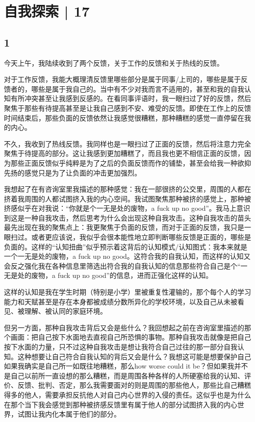 \chapter{自我探索 | 17}



\section*{1}

今天上午，我陆续收到了两个反馈，关于工作的反馈和关于热线的反馈。

对于工作反馈，我能大概理清反馈里哪些部分是属于同事/上司的，哪些是属于反馈者的，哪些是属于我自己的。当中有不少对我而言不适用的，甚至和我的自我认知有所冲突甚至让我感到反感的。在看同事评语时，我一眼扫过了好的反馈，然后聚焦于那些有待提高甚至是让我自己感到不安、难受的反馈。即使在工作上的反馈时间结束后，那些负面的反馈依然让我感觉很糟糕，那种糟糕的感觉一直停留在我的内心。

不久，我收到了热线反馈。我同样也是一眼扫过了正面的反馈，然后将注意力完全聚焦于待提高的部分。这让我感到更加糟糕了，而且我也更不相信正面的反馈，因为那些正面反馈似乎纯粹是为了之后的负面反馈而作的铺垫，甚至会给我一种欲抑先扬的感觉\pozhehao{}只是为了让负面的冲击更加强烈。

我想起了在有咨询室里我描述的那种感觉：我在一部很挤的公交里，周围的人都在挤着我\pozhehao{}周围的人都试图挤入我的内心空间。我试图聚焦那种被挤的感觉上，那种被挤感似乎在对我说：“你就是个一无是处的废物，a fuck up no good”。我马上意识到这是一种自我攻击，然后思考为什么会出现这种自我攻击。这种自我攻击的苗头最先出现在我的聚焦点上：我更聚焦于负面的反馈，而对于正面的反馈，我只是一眼扫过。或者更应该说，我似乎会很本能性地立即判断哪些反馈是正面的，哪些是负面的。这样的“认知扭曲”似乎预示着这背后的认知模式/认知图式：我本来就是一个一无是处的废物，a fuck up no good。这符合我的自我认知，而这样的认知又会反之强化我在各种信息里筛选出符合我的自我认知的信息\pozhehao{}那些符合自己是个“一无是处的废物，a fuck up no good”的信息，进而正强化这样的认知。

这样的认知是我在学生时期（特别是小学）里被重复性灌输的，那个每个人的学习能力和天赋甚至是存在本身都被成绩分数所异化的学校环境，以及自己从未被看见、被理解、被认同的家庭环境。

但另一方面，那种自我攻击背后又会是些什么？我回想起之前在咨询室里描述的那个画面：把自己按下水面地去直视自己所恐惧的事物。那种自我攻击就像是把自己按下水面的力量，只不过这种自我攻击是想让我符合自己过往的那一部分自我认知。这种想要让自己符合自我认知的背后又会是什么？我想这可能是想要保护自己\pozhehao{}如果我确实是自己所一如既往地糟糕，那么how worse could it be？但如果我并不是自己以前所一直设想的那么糟糕，而是周围各种各样的人所硬塞给我的认知、评价、反馈、批判、否定，那么我需要面对的则是周围的那些他人，那些比自己糟糕得多的他人，需要承担反抗他人对自己内心世界的入侵的责任。这似乎也是为什么在那个当下我会感觉到那种被挤感\pozhehao{}反馈里有属于他人的部分试图挤入我的内心世界，试图让我内化本属于他们的部分。


